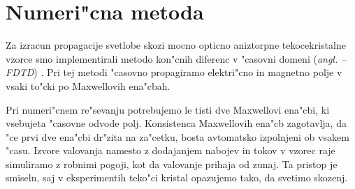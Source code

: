 \documentclass[12pt,twoside,openright,final]{report}
\newcommand{\todo}[1]{(\textbf{\textsmaller{TODO}: #1})}
\newcommand{\angl}[1]{(\textit{angl. #1})}
\renewcommand{\acf}[1]{\aclu{#1} -- \acs{#1}}
\begin{document}

\chapter{Numeri"cna metoda}

Za izracun propagacije svetlobe skozi mocno opticno aniztorpne tekocekristalne vzorce smo implementirali metodo kon"cnih diferenc v "casovni domeni \angl{\acf{FDTD}} \cite{taflove}. 
Pri tej metodi "casovno propagiramo elektri"cno in magnetno polje v vsaki to"cki po Maxwellovih ena"cbah. 

Pri numeri"cnem re"sevanju potrebujemo le tisti dve Maxwellovi ena"cbi, ki vsebujeta "casovne odvode polj. 
Konsistenca Maxwellovih ena"cb zagotavlja, da "ce prvi dve ena"cbi dr"zita na za"cetku, bosta avtomatsko izpolnjeni ob vsakem "casu\cite{taflove}. 
Izvore valovanja namesto z dodajanjem nabojev in tokov v vzorec raje simuliramo z robnimi pogoji, kot da valovanje prihaja od zunaj. 
Ta pristop je smiseln, saj v eksperimentih teko"ci kristal opazujemo tako, da svetimo skozenj. 
\end{document}
